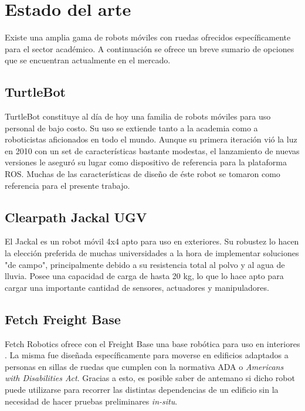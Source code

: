 \section{Estado del arte}

Existe una amplia gama de robots móviles con ruedas ofrecidos específicamente para el sector académico. A continuación se ofrece un breve sumario de opciones que se encuentran actualmente en el mercado.
\subsection{TurtleBot}

TurtleBot constituye al día de hoy una familia de robots móviles para uso personal de bajo costo. Su uso se extiende tanto a la academia como a roboticistas aficionados en todo el mundo.\newline
Aunque su primera iteración vió la luz en 2010 con un set de características bastante modestas, el lanzamiento de nuevas versiones le aseguró su lugar como dispositivo de referencia para la plataforma ROS. \newline
Muchas de las características de diseño de éste robot se tomaron como referencia para el presente trabajo.

\subsection{Clearpath Jackal UGV}

El Jackal es un robot móvil 4x4 apto para uso en exteriores. Su robustez lo hacen la elección preferida de muchas universidades a la hora de implementar soluciones "de campo", principalmente debido a su resistencia total al polvo y al agua de lluvia. Posee una capacidad de carga de hasta 20 kg, lo que lo hace apto para cargar una importante cantidad de sensores, actuadores y manipuladores.

\subsection{Fetch Freight Base}

Fetch Robotics ofrece con el Freight Base una base robótica para uso en interiores \citep{ARTICLE:1}. La misma fue diseñada específicamente para moverse en edificios adaptados a personas en sillas de ruedas que cumplen con la normativa ADA o \textit{Americans with Disabilities Act}. Gracias a esto, es posible saber de antemano si dicho robot puede utilizarse para recorrer las distintas dependencias de un edificio sin la necesidad de hacer pruebas preliminares \textit{in-situ}.

